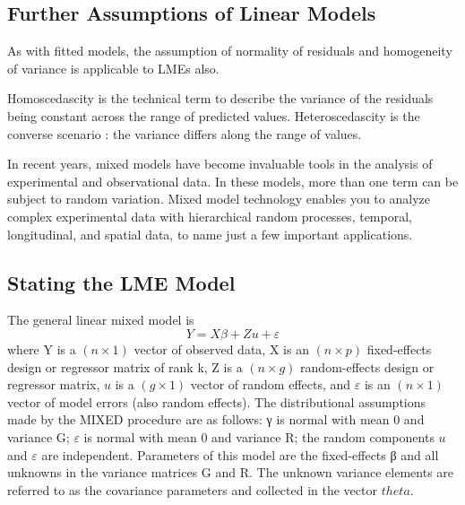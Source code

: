 \documentclass[12pt, a4paper]{article}
\begin{document}
\subsection{Further Assumptions of Linear Models}

As with fitted models, the assumption of normality of residuals and homogeneity of variance is applicable to LMEs also. 



Homoscedascity is the technical term to describe the variance of the
residuals being constant across the range of predicted values.
Heteroscedascity is the converse scenario : the variance differs along
the range of values.



In recent years, mixed models have become invaluable tools in the analysis of experimental and observational
data. In these models, more than one term can be subject to random variation. Mixed model
technology enables you to analyze complex experimental data with hierarchical random processes, temporal,
longitudinal, and spatial data, to name just a few important applications. 

\subsection{Stating the LME Model}
The general linear mixed
model is
\[
Y = X\beta + Zu + \varepsilon\]
where Y is a $(n\times1)$ vector of observed data, X is an $(n\times p)$ fixed-effects design or regressor matrix of rank
k, Z is a $(n \times g)$ random-effects design or regressor matrix, $u$ is a $(g \times 1)$ vector of random effects, and $\varepsilon$ is
an $(n\times1)$ vector of model errors (also random effects). The distributional assumptions made by the MIXED
procedure are as follows: γ is normal with mean 0 and variance G; $\varepsilon$ is normal with mean 0 and variance
R; the random components $u$ and $\varepsilon$ are independent. Parameters of this model are the fixed-effects β and
all unknowns in the variance matrices G and R. The unknown variance elements are referred to as the
covariance parameters and collected in the vector $theta$.
\end{document}
